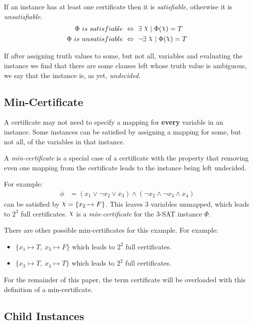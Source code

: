 If an instance has at least one certificate then it is \textit{satisfiable}, otherwise it is \textit{unsatisfiable}.
\begin{align*}
    \Phi~ is~ satisfiable~ & \Leftrightarrow~ \exists~ \rchi \mid \Phi(\rchi) = T \\
    \Phi~ is~ unsatisfiable~ & \Leftrightarrow~ \lnot \exists~ \rchi \mid \Phi(\rchi) = T
\end{align*}

If after assigning truth values to some, but not all, variables and evaluating the instance we find that there are some clauses left whose truth value is ambiguous, we say that the instance is, as yet, \textit{undecided}.


\subsection{Min-Certificate}
\label{subsec:min-certificate}

A certificate may not need to specify a mapping for \textbf{every} variable in an instance.
Some instances can be satisfied by assigning a mapping for some, but not all, of the variables in that instance.

A \textit{min-certificate} is a special case of a certificate with the property that removing even one mapping from the certificate leads to the instance being left undecided.

For example:
\begin{align*}
    \phi & = (x_1 \lor \lnot x_2 \lor x_3) \land (\lnot x_2 \land \lnot x_3 \land x_4)
\end{align*}
can be satisfied by $ \rchi = \{ x_2 \mapsto F \} $.
This leaves $3$ variables unmapped, which leads to $2^3$ full certificates.
$\rchi$ is a \textit{min-certificate} for the 3-SAT instance $\Phi$.

There are other possible min-certificates for this example.
For example:
\begin{itemize}
    \item $\{ x_1 \mapsto T,~ x_3 \mapsto F \}$ which leads to $2^2$ full certificates.
    \item $\{ x_3 \mapsto T,~ x_4 \mapsto T \}$ which leads to $2^2$ full certificates.
\end{itemize}

For the remainder of this paper, the term certificate will be overloaded with this definition of a min-certificate.


\subsection{Child Instances}
\label{subsec:child-instances}


